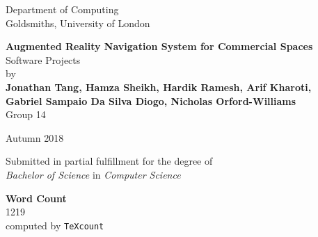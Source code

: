 \documentclass[12pt]{report}
\newcommand\blankpage{%
    \null
    \thispagestyle{empty}%
    \addtocounter{page}{-1}%
    \newpage}
\begin{document}
\begin{titlepage}
    \begin{center}
         \vspace*{1cm}
        Department of Computing\\
        Goldsmiths, University of London\\
        
        \vspace*{3.75cm}
        
        \textbf{\Large Augmented Reality Navigation System for Commercial Spaces}\\
        \vspace*{0.25cm}           
        Software Projects\\  
    
        \vspace*{2cm}
        by\\
        \vspace*{0.25cm}    
        \textbf{Jonathan Tang, Hamza Sheikh, Hardik Ramesh, Arif Kharoti,\\}
        \textbf{Gabriel Sampaio Da Silva Diogo, Nicholas Orford-Williams}\\
        \vspace*{0.1cm}    
        Group 14

        \vspace{2cm}
        
        Autumn 2018
        \vfill
        
        Submitted in partial fulfillment for the degree of\\
        \textit{Bachelor of Science} in \textit{Computer Science}
        
        \vspace{1.5cm}
        
    \end{center}
\end{titlepage}
\afterpage{\blankpage}
\thispagestyle{plain}

\begin{center}    
	\large
    \textbf{Word Count}\\
    1219\\
    computed by \texttt{TeXcount}
\end{center}
\end{document}

